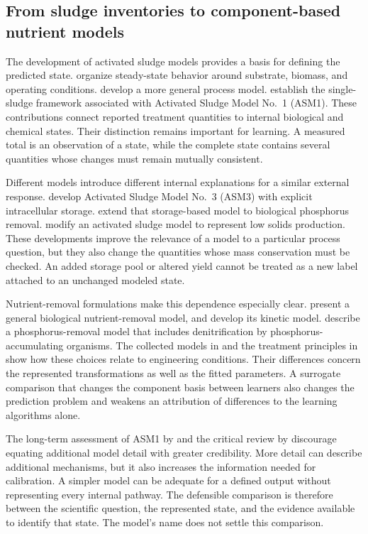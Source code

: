 \subsection{From sludge inventories to component-based nutrient models}

The development of activated sludge models provides a basis for defining the predicted state. \citet{Marais1976} organize steady-state behavior around substrate, biomass, and operating conditions. \citet{Dold1981} develop a more general process model. \citet{Henze1987} establish the single-sludge framework associated with Activated Sludge Model No.\ 1 (ASM1). These contributions connect reported treatment quantities to internal biological and chemical states. Their distinction remains important for learning. A measured total is an observation of a state, while the complete state contains several quantities whose changes must remain mutually consistent.

Different models introduce different internal explanations for a similar external response. \citet{Gujer1999} develop Activated Sludge Model No.\ 3 (ASM3) with explicit intracellular storage. \citet{Rieger2001} extend that storage-based model to biological phosphorus removal. \citet{Fall2015} modify an activated sludge model to represent low solids production. These developments improve the relevance of a model to a particular process question, but they also change the quantities whose mass conservation must be checked. An added storage pool or altered yield cannot be treated as a new label attached to an unchanged modeled state.

Nutrient-removal formulations make this dependence especially clear. \citet{Barker1997} present a general biological nutrient-removal model, and \citet{Hu2007} develop its kinetic model. \citet{Henze1999} describe a phosphorus-removal model that includes denitrification by phosphorus-accumulating organisms. The collected models in \citet{Henze2006} and the treatment principles in \citet{Henze2008} show how these choices relate to engineering conditions. Their differences concern the represented transformations as well as the fitted parameters. A surrogate comparison that changes the component basis between learners also changes the prediction problem and weakens an attribution of differences to the learning algorithms alone.

The long-term assessment of ASM1 by \citet{VanLoosdrecht2015} and the critical review by \citet{Hauduc2013} discourage equating additional model detail with greater credibility. More detail can describe additional mechanisms, but it also increases the information needed for calibration. A simpler model can be adequate for a defined output without representing every internal pathway. The defensible comparison is therefore between the scientific question, the represented state, and the evidence available to identify that state. The model's name does not settle this comparison.

